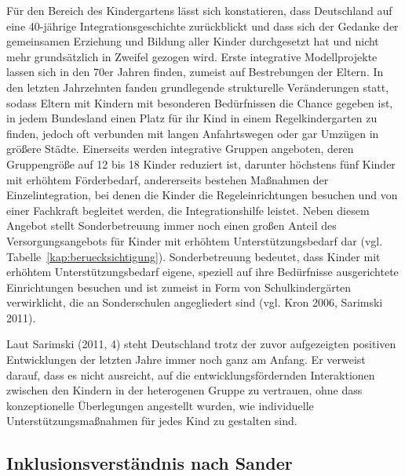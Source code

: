Für den Bereich des Kindergartens lässt sich konstatieren, dass Deutschland auf eine 40-jährige Integrationsgeschichte zurückblickt und dass sich der Gedanke der gemeinsamen Erziehung und Bildung aller Kinder durchgesetzt hat und nicht mehr grundsätzlich in Zweifel gezogen wird. Erste integrative Modellprojekte lassen sich in den 70er Jahren finden, zumeist auf Bestrebungen der Eltern. In den letzten Jahrzehnten fanden grundlegende strukturelle Veränderungen statt, sodass Eltern mit Kindern mit besonderen Bedürfnissen die Chance gegeben ist, in jedem Bundesland einen Platz für ihr Kind in einem Regelkindergarten zu finden, jedoch oft verbunden mit langen Anfahrtswegen oder gar Umzügen in größere Städte. Einerseits werden integrative Gruppen angeboten, deren Gruppengröße auf 12 bis 18 Kinder reduziert ist, darunter höchstens fünf Kinder mit erhöhtem Förderbedarf, andererseits bestehen Maßnahmen der Einzelintegration, bei denen die Kinder die Regeleinrichtungen besuchen und von einer Fachkraft begleitet werden, die Integrationshilfe leistet. Neben diesem Angebot stellt Sonderbetreuung immer noch einen großen Anteil des Versorgungsangebots für Kinder mit erhöhtem Unterstützungsbedarf dar (vgl. Tabelle~\ref{kap:beruecksichtigung}). Sonderbetreuung bedeutet, dass Kinder mit erhöhtem Unterstützungsbedarf eigene, speziell auf ihre Bedürfnisse 
ausgerichtete Einrichtungen besuchen und ist zumeist in Form von Schulkindergärten verwirklicht, die an Sonderschulen angegliedert sind (vgl. Kron 2006, Sarimski 2011).

Laut Sarimski (2011, 4) steht Deutschland trotz der zuvor aufgezeigten positiven Entwicklungen der letzten Jahre immer noch ganz am Anfang. Er verweist darauf, dass es nicht ausreicht, auf die entwicklungsfördernden Interaktionen zwischen den Kindern in der heterogenen Gruppe zu vertrauen, ohne dass konzeptionelle Überlegungen angestellt wurden, wie individuelle Unterstützungsmaßnahmen für jedes Kind zu gestalten sind.  


\subsection{Inklusionsverständnis nach Sander} 

